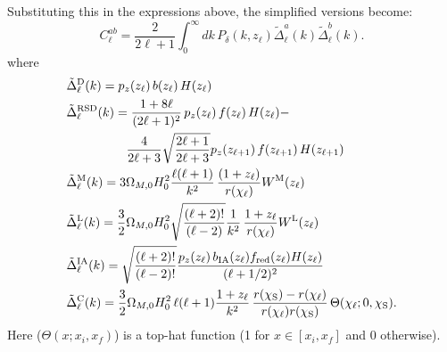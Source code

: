 \documentclass[\docopts]{\docclass}
\begin{document}
Substituting this in the expressions above, the simplified versions become:
\begin{equation}\label{eq:limber}
 C^{ab}_\ell=\frac{2}{2\ell+1}\int_0^\infty dk\,P_\delta\left(k,z_\ell\right)
 \tilde{\Delta}^a_\ell(k)\tilde{\Delta}^b_\ell(k).
\end{equation}
where
\begin{align}
 &\tilde{\Delta}_\ell^{\rm D}(k)=p_z(z_\ell)\,b(z_\ell)\,H(z_\ell)\\
 &\tilde{\Delta}_\ell^{\rm RSD}(k)=
 \frac{1+8\ell}{(2\ell+1)^2}\,p_z(z_\ell)\,f(z_\ell)\,H(z_\ell)-\\
 &\hspace{48pt}\frac{4}{2\ell+3}\sqrt{\frac{2\ell+1}{2\ell+3}}p_z(z_{\ell+1})\,f(z_{\ell+1})\,H(z_{\ell+1})\\
 &\tilde{\Delta}_\ell^{\rm M}(k)=3\Omega_{M,0}H_0^2\frac{\ell(\ell+1)}{k^2}\,
 \frac{(1+z_\ell)}{r(\chi_\ell)}W^{\rm M}(z_\ell)\\
 &\tilde{\Delta}_\ell^{\rm L}(k)=\frac{3}{2}\Omega_{M,0}H_0^2\sqrt{\frac{(\ell+2)!}{(\ell-2)}}\frac{1}{k^2}\,
 \frac{1+z_\ell}{r(\chi_\ell)}W^{\rm L}(z_\ell)\\
 &\tilde{\Delta}_\ell^{\rm IA}(k)=\sqrt{\frac{(\ell+2)!}{(\ell-2)!}}\frac{p_z(z_\ell)\,b_{\rm IA}(z_\ell)f_{\rm red}(z_\ell)H(z_\ell)}{(\ell+1/2)^2}\\
 &\tilde{\Delta}_\ell^{\rm C}(k)=\frac{3}{2}\Omega_{M,0}H_0^2\,\ell(\ell+1)\frac{1+z_\ell}{k^2}\,\frac{r(\chi_{\rm S})-r(\chi_\ell)}{r(\chi_\ell)r(\chi_{\rm S})}\,\Theta(\chi_\ell;0,\chi_{\rm S}).
\end{align}
Here ($\Theta(x;x_i,x_f)$) is a top-hat function (1 for $x\in[x_i,x_f]$ and 0 otherwise).

%
%
\end{document}
